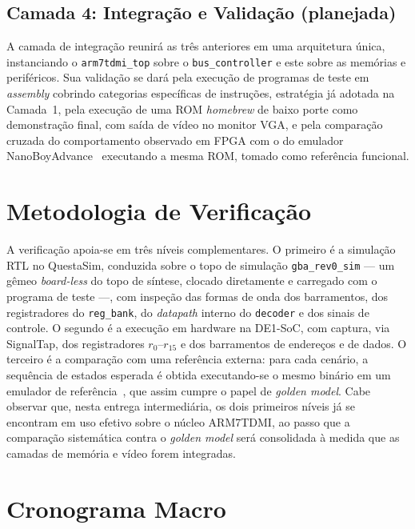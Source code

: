 \documentclass[pnumromarab,times]{politex}
\begin{document}
\subsection{Camada 4: Integração e Validação (planejada)}

A camada de integração reunirá as três anteriores em uma arquitetura
única, instanciando o \texttt{arm7tdmi\_top} sobre o
\texttt{bus\_controller} e este sobre as memórias e periféricos. Sua
validação se dará pela execução de programas de teste em
\textit{assembly} cobrindo categorias específicas de instruções,
estratégia já adotada na Camada~1, pela execução de uma ROM
\textit{homebrew} de baixo porte como demonstração final, com saída de
vídeo no monitor VGA, e pela comparação cruzada do comportamento
observado em FPGA com o do emulador NanoBoyAdvance~\cite{NanoBoyAdvance}
executando a mesma ROM, tomado como referência funcional.


\section{Metodologia de Verificação}
\label{sec:verificacao}

A verificação apoia-se em três níveis complementares. O primeiro é a
simulação RTL no QuestaSim, conduzida sobre o topo de simulação
\texttt{gba\_rev0\_sim} --- um gêmeo \textit{board-less} do topo de
síntese, clocado diretamente e carregado com o programa de teste ---,
com inspeção das formas de onda dos barramentos, dos registradores do
\texttt{reg\_bank}, do \textit{datapath} interno do \texttt{decoder} e
dos sinais de controle. O segundo é a execução em hardware na DE1-SoC,
com captura, via SignalTap, dos registradores $r_0$--$r_{15}$ e dos
barramentos de endereços e de dados. O terceiro é a comparação com uma
referência externa: para cada cenário, a sequência de estados esperada
é obtida executando-se o mesmo binário em um emulador de
referência~\cite{mGBA,NanoBoyAdvance}, que assim cumpre o papel de
\textit{golden model}. Cabe observar que, nesta entrega intermediária,
os dois primeiros níveis já se encontram em uso efetivo sobre o núcleo
ARM7TDMI, ao passo que a comparação sistemática contra o
\textit{golden model} será consolidada à medida que as camadas de
memória e vídeo forem integradas.


\section{Cronograma Macro}
\label{sec:cronograma}
\end{document}
